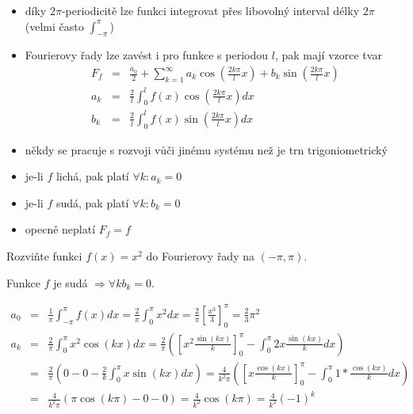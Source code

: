 \begin{poznamka}
\begin{itemize} \quad
\item díky $2 \pi$-periodicitě lze funkci integrovat přes libovolný interval délky $2 \pi$ (velmi často $\int_{-\pi}^{\pi}$)
\item Fourierovy řady lze zavést i pro funkce s periodou $l$, pak mají vzorce tvar
\begin{eqnarray*}
F_f & = & \frac{a_0}{2} + \sum_{k=1}^{\infty} a_k \cos \left( \frac{2 k \pi}{l} x \right) + b_k \sin \left( \frac{2 k \pi}{l} x \right) \\
a_k & = & \frac{2}{l} \int_0^{l} f(x) \cos \left( \frac{2 k \pi}{l} x \right) dx \\
b_k & = & \frac{2}{l} \int_0^l f(x) \sin \left( \frac{2 k \pi}{l} x \right) dx 
\end{eqnarray*}
\item někdy se pracuje s rozvoji vůči jinému systému než je trn trigoniometrický
\item je-li $f$ lichá, pak platí $\forall k : a_k = 0$
\item je-li $f$ sudá, pak platí $\forall k : b_k = 0$
\item opecně neplatí $F_f = f$
\end{itemize}
\end{poznamka}

\begin{priklad}
Rozviňte funkci $f(x) = x^2$ do Fourierovy řady na $(-\pi, \pi)$.
\end{priklad}

Funkce $f$ je sudá $\Rightarrow \forall k b_k = 0$.

\begin{eqnarray*}
a_0 & = & \frac{1}{\pi} \int_{-\pi}^{\pi} f(x) dx = \frac{2}{\pi} \int_0^{\pi} x^2 dx = \frac{2}{\pi} \left[ \frac{x^3}{3} \right]_0^\pi = \frac{2}{3} \pi^2 \\
a_k & = & \frac{2}{\pi} \int_{0}^{\pi} x^2 \cos (kx) dx = \frac{2}{\pi} \left( \left[x^2 \frac{\sin (kx)}{k} \right]_0^\pi - \int_0^\pi 2x \frac{\sin (kx)}{k} dx \right) \\
& = & \frac{2}{\pi} \left( 0 - 0 - \frac{2}{k} \int_0^\pi x \sin (kx) dx \right) = \frac{4}{k^2 \pi} \left( \left[ x \frac{\cos (kx)}{k} \right]_0^\pi - \int_0^\pi 1 * \frac{\cos(kx)}{k} dx \right) \\
& = & \frac{4}{k^2 \pi} \left( \pi \cos (k \pi) - 0 - 0 \right) = \frac{4}{k^2} \cos (k \pi) = \frac{4}{k^2} (-1)^k 
\end{eqnarray*}

